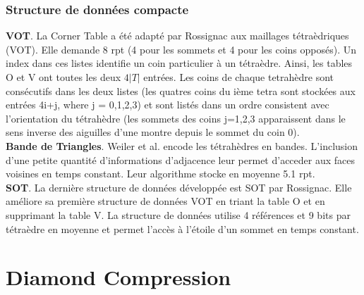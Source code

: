 \documentclass[a4paper,11pt,openany]{article}
\begin{document}
\subsubsection{Structure de données compacte}
\noindent
\textbf{VOT}. La Corner Table a été adapté par Rossignac aux maillages tétraèdriques (VOT). Elle demande 8 rpt (4 pour les sommets et 4 pour les coins opposés). Un index dans ces listes identifie un coin particulier à un tétraèdre. Ainsi, les tables O et V ont toutes les deux $4|T|$ entrées. Les coins de chaque tetrahèdre sont consécutifs dans les deux listes (les quatres coins du ième tetra sont stockées aux entrées  4i+j, where j = 0,1,2,3) et sont listés dans un ordre consistent avec l'orientation du tétrahèdre (les sommets des coins j=1,2,3 apparaissent dans le sens inverse des aiguilles d'une montre depuis le sommet du coin 0).\\
\textbf{Bande de Triangles}. Weiler et al. \cite{triangle_strips_weiler} encode les tétrahèdres en bandes. L'inclusion d'une petite quantité d'informations d'adjacence leur permet d'acceder aux faces voisines en temps constant. Leur algorithme stocke en moyenne 5.1 rpt.\\
\textbf{SOT}. La dernière structure de données développée est SOT \cite{SOT} par Rossignac. Elle améliore sa première structure de données VOT en triant la table O et en supprimant la table V. La structure de données utilise 4 références et 9 bits par tétraèdre en moyenne et permet l'accès à l'étoile d'un sommet en temps constant.

\section{Diamond Compression}
\end{document}
